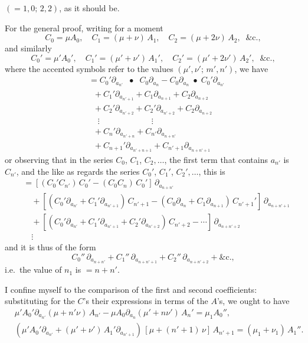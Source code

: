 \documentclass[11pt]{article}
\begin{document}
\medskip
\noindent
$(=1,0;\,2,2)$, as it should be.

\bigskip

For the general proof, writing for a moment
\[ C_{0} = \mu A_{0},\quad C_{1} = (\mu+\nu)\,A_{1},\quad C_{2} = (\mu+2\nu)\,A_{2},\;\;\&\text{c.}, \]
and similarly
\[ C_{0}' = \mu' A_{0}',\quad C_{1}' = (\mu'+\nu')\,A_{1}',\quad C_{2}' = (\mu'+2\nu')\,A_{2}',\;\;\&\text{c.}, \]
where the accented symbols refer to the values $(\mu',\nu';\,m',n')$, we have
\begin{align*}
[(\mu',\nu';\,m',n')\,(\mu,\nu;\,m,n)]
 &= C_{0}'\partial_{a_{n'}}\;\;\bullet\;\;C_{0}\partial_{a_{n}} - C_{0}\partial_{a_{n}}\;\bullet\;C_{0}'\partial_{a_{n'}}\\
 &\;\;+ C_{1}'\partial_{a_{n'+1}} + C_{1}\partial_{a_{n+1}} + C_{2}\partial_{a_{n+2}}\\
 &\;\;+ C_{2}'\partial_{a_{n'+2}} + C_{2}'\partial_{a_{n'+2}} + C_{2}\partial_{a_{n+2}}\\
 &\;\;\;\;\vdots\qquad\qquad\qquad\;\vdots\\
 &\;\;+ C_{n}'\partial_{a_{n'+n}} + C_{n'}\partial_{a_{n+n'}}\\
 &\;\;+ C_{n+1}'\partial_{a_{n'+n+1}} + C_{n'+1}\partial_{a_{n+n'+1}}
\end{align*}
or observing that in the series $C_{0}$, $C_{1}$, $C_{2},\ldots$, the first term that contains $a_{n'}$ is $C_{n'}$, and the like as regards the series $C_{0}'$, $C_{1}'$, $C_{2}',\ldots$, this is
\begin{align*}
&= [(C_{0}'C_{n'})\,C_{0}' - (C_{0}C_{n})\,C_{0}']\,\partial_{a_{n+n'}}\\
&\quad + [(C_{0}'\partial_{a_{n'}} + C_{1}'\partial_{a_{n'+1}})\,C_{n'+1} - (C_{0}\partial_{a_{n}} + C_{1}\partial_{a_{n+1}})\,C_{n'+1}']\,\partial_{a_{n+n'+1}}\\
&\quad + [(C_{0}'\partial_{a_{n'}} + C_{1}'\partial_{a_{n'+1}} + C_{2}'\partial_{a_{n'+2}})\,C_{n'+2} - \cdots]\,\partial_{a_{n+n'+2}}\\
&\quad\vdots
\end{align*}
and it is thus of the form
\[ C_{0}''\,\partial_{a_{n+n'}} + C_{1}''\,\partial_{a_{n+n'+1}} + C_{2}''\,\partial_{a_{n+n'+2}} + \&\text{c.}, \]
i.e.\ the value of $n_{1}$ is $=n+n'$.

I confine myself to the comparison of the first and second coefficients: substituting for the $C$'s their expressions in terms of the $A$'s, we ought to have
\begin{align*}
&\mu'A_{0}'\partial_{a_{n'}}(\mu+n'\nu)\,A_{n'} - \mu A_{0}\partial_{a_{n}}(\mu'+n\nu')\,A_{n}' = \mu_{1}A_{0}'',\\
&(\mu'A_{0}'\partial_{a_{n'}} + (\mu'+\nu')\,A_{1}'\partial_{a_{n'+1}})\,[\mu+(n'+1)\,\nu]\,A_{n'+1} = (\mu_{1}+\nu_{1})\,A_{1}''.
\end{align*}
\end{document}
